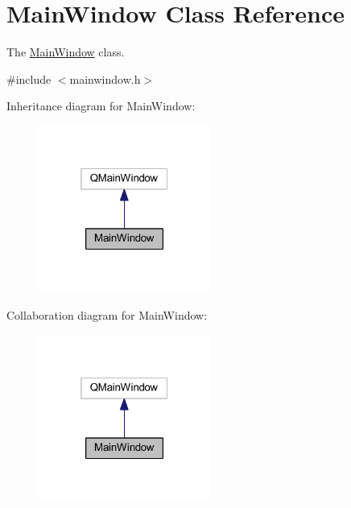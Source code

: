 \hypertarget{class_main_window}{}\section{Main\+Window Class Reference}
\label{class_main_window}


The \mbox{\hyperlink{class_main_window}{Main\+Window}} class.  




{\ttfamily \#include $<$mainwindow.\+h$>$}



Inheritance diagram for Main\+Window\+:
\nopagebreak
\begin{figure}[H]
\begin{center}
\leavevmode
\includegraphics[width=160pt]{class_main_window__inherit__graph}
\end{center}
\end{figure}


Collaboration diagram for Main\+Window\+:
\nopagebreak
\begin{figure}[H]
\begin{center}
\leavevmode
\includegraphics[width=160pt]{class_main_window__coll__graph}
\end{center}
\end{figure}
